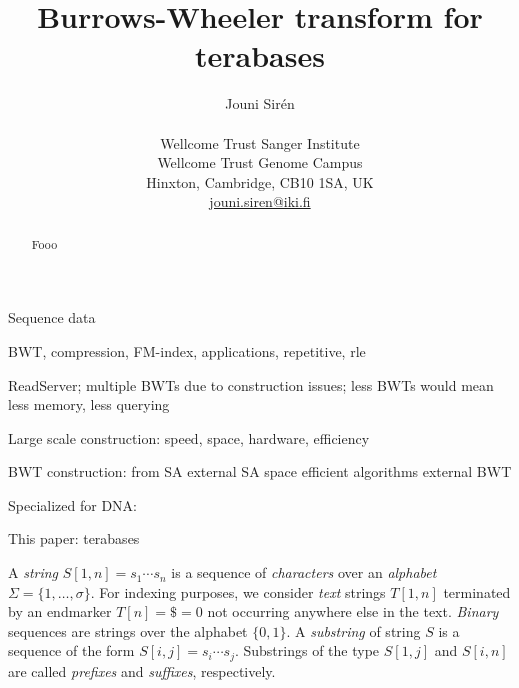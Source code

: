 \documentclass[smallabstract,smallcaptions]{dccpaper}
\newcommand{\set}[1]{\ensuremath{\{ #1 \}}}
\begin{document}
\title
{\large
\textbf{Burrows-Wheeler transform for terabases}
}


\author{%
Jouni Sirén \\[0.5em]
{\small\begin{minipage}{\linewidth}\begin{center}
\begin{tabular}{c}
Wellcome Trust Sanger Institute \\
Wellcome Trust Genome Campus \\
Hinxton, Cambridge, CB10 1SA, UK \\
\url{jouni.siren@iki.fi}
\end{tabular}
\end{center}\end{minipage}}
}


\maketitle
\thispagestyle{empty}


\begin{abstract}
Fooo
\end{abstract}



Sequence data

BWT, compression, FM-index, applications, repetitive, rle

ReadServer; multiple BWTs due to construction issues; less BWTs would mean less memory, less querying

Large scale construction: speed, space, hardware, efficiency

BWT construction: from SA \cite{Mori2008,Nong2011}
external SA \cite{Gonnet1992,Bingmann2013,Kaerkkaeinen2014a,Nong2014,Kaerkkaeinen2015a}
space efficient algorithms \cite{Hon2007,Kaerkkaeinen2007,Siren2009,Okanohara2009}
external BWT \cite{Ferragina2012,Beller2013}

Specialized for DNA: \cite{Bauer2013,Liu2014,Li2014a,Pantaleoni2014,Wang2015}

This paper: terabases



A \emph{string} $S[1,n] = s_{1} \dotsm s_{n}$ is a sequence of \emph{characters} over an \emph{alphabet} $\Sigma = \set{1, \dotsc, \sigma}$. For indexing purposes, we consider \emph{text} strings $T[1,n]$ terminated by an endmarker $T[n] = \$ = 0$ not occurring anywhere else in the text. \emph{Binary} sequences are strings over the alphabet $\set{0, 1}$. A \emph{substring} of string $S$ is a sequence of the form $S[i,j] = s_{i} \dotsm s_{j}$. Substrings of the type $S[1,j]$ and $S[i,n]$ are called \emph{prefixes} and \emph{suffixes}, respectively.
\end{document}
